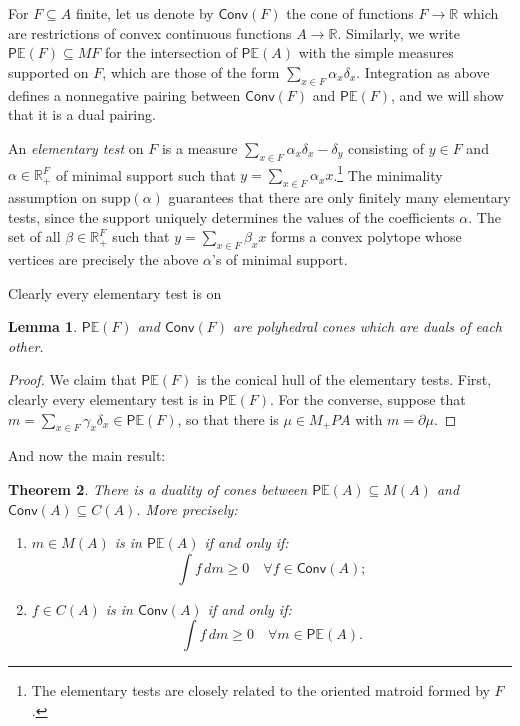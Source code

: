 \documentclass[a4paper,12pt]{scrartcl}
\numberwithin{equation}{section}
\theoremstyle{plain}
\newtheorem{thm}{Theorem}[subsection]
\newtheorem{lemma}[thm]{Lemma}
\theoremstyle{definition}
\newcommand{\R}{\mathbb{R}}
\DeclareMathOperator{\1}{\mathbbm{1}}
\DeclareMathOperator{\2}{\mathbbm{2}}
\newcommand{\E}{\mathbb{E}}
\newcommand{\supp}{\mathrm{supp}}
\newcommand{\Conv}{\mathsf{Conv}} %
\newcommand{\PCM}{\mathsf{P}\E} %
\begin{document}
For $F\subseteq A$ finite, let us denote by $\Conv(F)$ the cone of functions $F\to\R$ which are restrictions of convex continuous functions $A\to\R$. Similarly, we write $\PCM(F)\subseteq MF$ for the intersection of $\PCM(A)$ with the simple measures supported on $F$, which are those of the form $\sum_{x\in F} \alpha_x \delta_x$. Integration as above defines a nonnegative pairing between $\Conv(F)$ and $\PCM(F)$, and we will show that it is a dual pairing.

An \emph{elementary test} on $F$ is a measure $\sum_{x\in F} \alpha_x \delta_x - \delta_y$ consisting of $y\in F$ and $\alpha\in \R_+^F$ of minimal support such that $y = \sum_{x\in F} \alpha_x x$.\footnote{The elementary tests are closely related to the oriented matroid formed by $F$.} The minimality assumption on $\supp(\alpha)$ guarantees that there are only finitely many elementary tests, since the support uniquely determines the values of the coefficients $\alpha$. The set of all $\beta\in \R_+^F$ such that $y = \sum_{x\in F} \beta_x x$ forms a convex polytope whose vertices are precisely the above $\alpha$'s of minimal support.

Clearly every elementary test is on 

\begin{lemma}
$\PCM(F)$ and $\Conv(F)$ are polyhedral cones which are duals of each other.
\label{Fdual}
\end{lemma}

\begin{proof}

We claim that $\PCM(F)$ is the conical hull of the elementary tests. First, clearly every elementary test is in $\PCM(F)$. For the converse, suppose that $m = \sum_{x\in F} \gamma_x \delta_x \in \PCM(F)$, so that there is $\mu\in M_+ PA$ with $m = \partial \mu$.
\end{proof}

And now the main result:

\begin{thm}
\label{main}
 There is a duality of cones between $\PCM(A)\subseteq M(A)$ and $\Conv(A)\subseteq C(A)$. More precisely:
 \begin{enumerate}
  \item\label{a} $m\in M(A)$ is in $\PCM(A)$ if and only if:
  \begin{equation}
   \int f \, dm \ge 0 \quad \forall f\in\Conv(A) ;
  \end{equation}
\item\label{b} $f\in C(A)$ is in $\Conv(A)$ if and only if:
  \begin{equation}
   \int f \, dm \ge 0 \quad \forall m\in\PCM(A) .
  \end{equation}
 \end{enumerate}
\end{thm}
\end{document}
